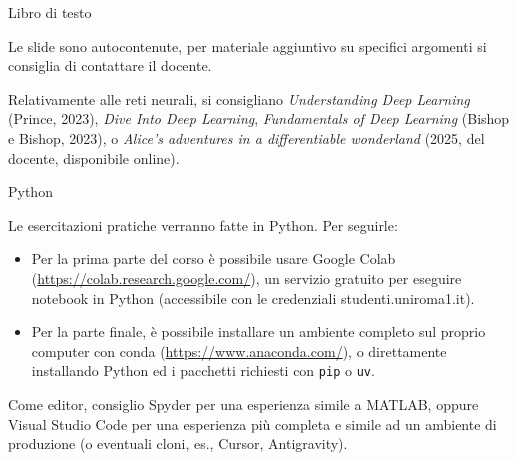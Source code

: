 \documentclass[12pt,aspectratio=169,notheorems]{beamer}
\begin{document}
\begin{frame}{Libro di testo}

	Le slide sono autocontenute, per materiale aggiuntivo su specifici argomenti si consiglia di contattare il docente.

	Relativamente alle reti neurali, si consigliano \textit{Understanding Deep Learning} (Prince, 2023), \textit{Dive Into Deep Learning}, \textit{Fundamentals of Deep Learning} (Bishop e Bishop, 2023), o \textit{Alice's adventures in a differentiable wonderland} (2025, del docente, disponibile online).

\end{frame}

\begin{frame}{Python}

	Le esercitazioni pratiche verranno fatte in Python. Per seguirle:

	\begin{itemize}
		\item Per la prima parte del corso è possibile usare Google Colab (\url{https://colab.research.google.com/}), un servizio gratuito per eseguire notebook in Python (accessibile con le credenziali studenti.uniroma1.it).
		\item Per la parte finale, è possibile installare un ambiente completo sul proprio computer con conda (\url{https://www.anaconda.com/}), o direttamente installando Python ed i pacchetti richiesti con \texttt{pip} o \texttt{uv}.
	\end{itemize}

	Come editor, consiglio Spyder per una esperienza simile a MATLAB, oppure Visual Studio Code per una esperienza più completa e simile ad un ambiente di produzione (o eventuali cloni, es., Cursor, Antigravity).

\end{frame}
\end{document}
